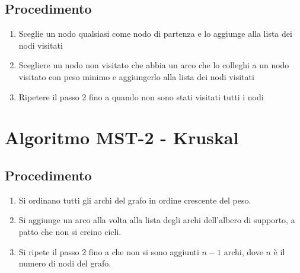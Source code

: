   \subsection{Procedimento}
  \begin{enumerate}
    \item Sceglie un nodo qualsiasi come nodo di partenza e lo aggiunge alla lista dei nodi visitati
    \item Scegliere un nodo non visitato che abbia un arco che lo colleghi a un nodo visitato con peso minimo e aggiungerlo alla lista dei nodi visitati
    \item Ripetere il passo 2 fino a quando non sono stati visitati tutti i nodi
  \end{enumerate}
  



\section{Algoritmo MST-2 - Kruskal}

\begin{center}
\end{center}


  \subsection{Procedimento}
  \begin{enumerate}
    \item Si ordinano tutti gli archi del grafo in ordine crescente del peso.
    \item Si aggiunge un arco alla volta alla lista degli archi dell'albero di supporto, a patto che non si creino cicli.
    \item Si ripete il passo 2 fino a che non si sono aggiunti $n-1$ archi, dove $n$ è il numero di nodi del grafo.
  \end{enumerate}








